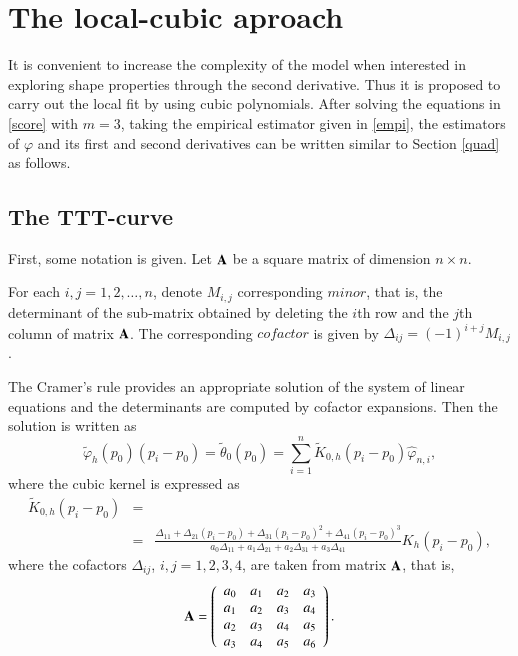 \documentclass[preprint,12pt]{elsarticle}
\begin{document}
%

\appendix

\section{The local-cubic aproach} \label{ap:cubic}
It is convenient to increase the complexity of the model when interested in exploring shape properties through the second derivative.
Thus it is proposed to carry out the local fit by using cubic polynomials. After solving the equations in \eqref{score} with $m=3$, taking  the empirical estimator given in \eqref{empi},  the estimators of $\varphi$ and its first and second derivatives can be written similar to Section \ref{quad} as follows.
%

\subsection{The TTT-curve }%

\noindent First, some notation is given. Let ${\bf A}$ be a square matrix of dimension $n \times n$. 

For each $i, j =1,2,\ldots, n$, denote $M_{i,j}$ corresponding $minor$, that is, the determinant of the sub-matrix obtained by deleting the $i$th row and the $j$th column of matrix ${\bf A}$. The corresponding $cofactor$ is given by  $\Delta_{ij}=(-1)^{i+j} M_{i,j}$. 

The Cramer's rule provides an appropriate solution of the system of linear equations and the determinants are computed by cofactor expansions. Then the solution is written as
\begin{equation}\label{phi.cub}
\widetilde{\varphi}_h(p_0)\left(p_i-p_0\right)= \widetilde{\theta}_0(p_0)=\sum_{i=1}^n \widetilde{K}_{0,h}\left(p_i-p_0\right) \widehat{\varphi}_{n,i},
\end{equation}
where the cubic kernel is expressed as
\begin{eqnarray*}
\widetilde{K}_{0,h}\left(p_i-p_0\right)&=& \\
&=&\frac{\Delta_{11}+\Delta_{21}\left(p_i-p_0 \right)+\Delta_{31}\left(p_i-p_0 \right)^2+\Delta_{41}\left(p_i-p_0 \right)^3}{a_0 \Delta_{11}+ a_1 \Delta_{21}+a_2 \Delta_{31}+a_3 \Delta_{41}} K_h\left(p_i-p_0\right),
\end{eqnarray*}
where the cofactors $\Delta_{ij}$, $i,j=1, 2, 3, 4$, are taken from matrix ${\bf A}$, that is,
\[
{\bf A} =\left(\begin{array}{cccc}
a_0 & a_1&a_2 &a_3 \\ 
a_{1} & a_2&a_3 &a_{4}\\
a_2 & a_3 &a_4 &a_5 \\ 
a_3 & a_4&a_5 &a_{6} 
\end{array}\right).
\]
\end{document}
